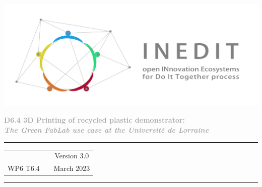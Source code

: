 \documentclass[
  11pt,
]{article}
\subtitle{Version: January 05 / 2024 - 15 : 11}
\author{}
\date{}
\begin{document}
\begin{titlepage}
	\begin{center}

		\vspace{30mm}
		
		\includegraphics[width=\linewidth]{figures/Inedit_horiz.pdf}\\ 
		
		\vfill
		
		\textbf{\Huge{\textcolor{darkgray}{ D6.4 3D Printing of recycled plastic demonstrator: }}} \\[5pt] 
		
		\textbf{\LARGE{\textcolor{darkgray}{\emph{The Green FabLab use case at the Université de Lorraine}}}} \\ 
		 
		 
		\vfill
		
		\vspace{60mm} 
		
		
		
      \textcolor{gray}{\rule{\textwidth}{2pt}}
      
		\vspace{5pt}
		\begin{tabular}{ c p{8cm} c }
           & & Version 3.0  \\ 
         WP6 T6.4  & & March 2023   \\ 
      \end{tabular}
		\vspace{5pt} 
		
		\textcolor{gray}{\rule{\textwidth}{2pt}}
		
		
	
		
		\vfill
		
	\end{center}
\end{titlepage}

\newpage
\end{document}

